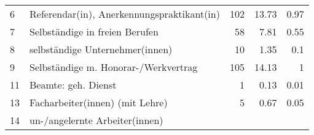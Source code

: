 \begin{longtable}{lXrrr}
     6 &
     \multicolumn{1}{X}{ Referendar(in), Anerkennungspraktikant(in)   } &


       \num{102} &
       \num[round-mode=places,round-precision=2]{13.73} &
         \num[round-mode=places,round-precision=2]{0.97} \\

     7 &
     \multicolumn{1}{X}{ Selbständige in freien Berufen   } &


       \num{58} &
       \num[round-mode=places,round-precision=2]{7.81} &
         \num[round-mode=places,round-precision=2]{0.55} \\

     8 &
     \multicolumn{1}{X}{ selbständige Unternehmer(innen)   } &


       \num{10} &
       \num[round-mode=places,round-precision=2]{1.35} &
         \num[round-mode=places,round-precision=2]{0.1} \\

     9 &
     \multicolumn{1}{X}{ Selbständige m. Honorar-/Werkvertrag   } &


       \num{105} &
       \num[round-mode=places,round-precision=2]{14.13} &
         \num[round-mode=places,round-precision=2]{1} \\

     11 &
     \multicolumn{1}{X}{ Beamte: geh. Dienst   } &


       \num{1} &
       \num[round-mode=places,round-precision=2]{0.13} &
         \num[round-mode=places,round-precision=2]{0.01} \\

     13 &
     \multicolumn{1}{X}{ Facharbeiter(innen) (mit Lehre)   } &


       \num{5} &
       \num[round-mode=places,round-precision=2]{0.67} &
         \num[round-mode=places,round-precision=2]{0.05} \\

     14 &
     \multicolumn{1}{X}{ un-/angelernte Arbeiter(innen)   } &



\end{longtable}
